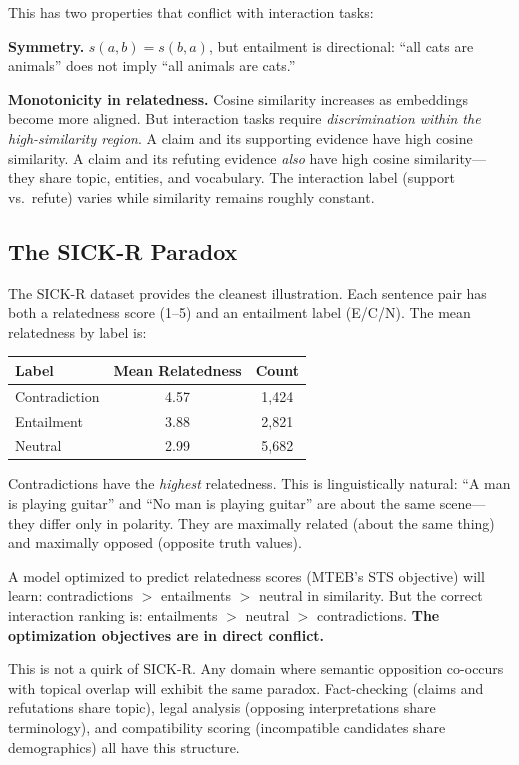 \documentclass{article}
\begin{document}
This has two properties that conflict with interaction tasks:

\textbf{Symmetry.} $s(a, b) = s(b, a)$, but entailment is directional: ``all cats are animals'' does not imply ``all animals are cats.''

\textbf{Monotonicity in relatedness.} Cosine similarity increases as embeddings become more aligned. But interaction tasks require \emph{discrimination within the high-similarity region}. A claim and its supporting evidence have high cosine similarity. A claim and its refuting evidence \emph{also} have high cosine similarity---they share topic, entities, and vocabulary. The interaction label (support vs.\ refute) varies while similarity remains roughly constant.

\subsection{The SICK-R Paradox}

The SICK-R dataset provides the cleanest illustration. Each sentence pair has both a relatedness score (1--5) and an entailment label (E/C/N). The mean relatedness by label is:

\begin{center}
\begin{tabular}{lcc}
\toprule
\textbf{Label} & \textbf{Mean Relatedness} & \textbf{Count} \\
\midrule
Contradiction & 4.57 & 1,424 \\
Entailment & 3.88 & 2,821 \\
Neutral & 2.99 & 5,682 \\
\bottomrule
\end{tabular}
\end{center}

Contradictions have the \emph{highest} relatedness. This is linguistically natural: ``A man is playing guitar'' and ``No man is playing guitar'' are about the same scene---they differ only in polarity. They are maximally related (about the same thing) and maximally opposed (opposite truth values).

A model optimized to predict relatedness scores (MTEB's STS objective) will learn: contradictions $>$ entailments $>$ neutral in similarity. But the correct interaction ranking is: entailments $>$ neutral $>$ contradictions. \textbf{The optimization objectives are in direct conflict.}

This is not a quirk of SICK-R. Any domain where semantic opposition co-occurs with topical overlap will exhibit the same paradox. Fact-checking (claims and refutations share topic), legal analysis (opposing interpretations share terminology), and compatibility scoring (incompatible candidates share demographics) all have this structure.
\end{document}

